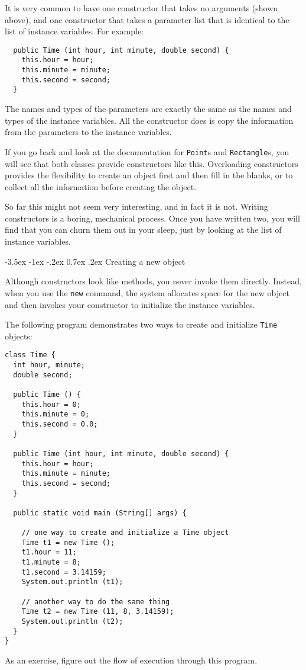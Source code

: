 \documentclass{book}
\makeatletter
\renewcommand{\section}{\@startsection 
    {section} {1} {0mm}%
    {-3.5ex \@plus -1ex \@minus -.2ex}%
    {0.7ex \@plus.2ex}%
    {\normalfont\Large\bfseries}}
\makeatother
\begin{document}
It is very common to have one constructor that takes no
arguments (shown above), and one constructor that takes
a parameter list that is identical to the list of instance
variables.  For example:

\begin{verbatim}
  public Time (int hour, int minute, double second) {
    this.hour = hour;
    this.minute = minute;
    this.second = second;
  }
\end{verbatim}
%
The names and types of the parameters are exactly the same as
the names and types of the instance variables.  All the
constructor does is copy the information from the parameters
to the instance variables.

If you go back and look at the documentation for {\tt Point}s
and {\tt Rectangle}s, you will see that both classes provide
constructors like this.  Overloading constructors provides the
flexibility to create an object first and then fill in the
blanks, or to collect all the information before creating
the object.

So far this might not seem very interesting, and in fact it
is not.  Writing constructors is a boring, mechanical process.
Once you have written two, you will find that you can churn them
out in your sleep, just by looking at the list of instance
variables.

\section{Creating a new object}

Although constructors look like methods, you never invoke them
directly.  Instead, when you use the {\tt new} command, the system
allocates space for the new object and then 
invokes your constructor to initialize the instance variables.

The following program demonstrates two ways to create and
initialize {\tt Time} objects:

\begin{verbatim}
class Time {
  int hour, minute;
  double second;

  public Time () {
    this.hour = 0;
    this.minute = 0;
    this.second = 0.0;
  }

  public Time (int hour, int minute, double second) {
    this.hour = hour;
    this.minute = minute;
    this.second = second;
  }

  public static void main (String[] args) {

    // one way to create and initialize a Time object
    Time t1 = new Time ();
    t1.hour = 11;
    t1.minute = 8;
    t1.second = 3.14159;
    System.out.println (t1);

    // another way to do the same thing
    Time t2 = new Time (11, 8, 3.14159);
    System.out.println (t2);
  }
}
\end{verbatim}
%
As an exercise, figure out the flow of execution through this
program.
\end{document}
